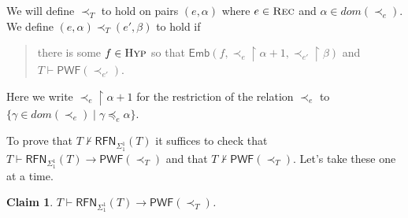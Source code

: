 \documentclass{amsart}
\newtheorem*{claim}{Claim}
\theoremstyle{definition}
\theoremstyle{remark}
\begin{document}

We will define $\prec_T$ to hold on pairs $(e,\alpha)$ where $e\in\textsc{Rec}$ and $\alpha\in dom(\prec_e)$.  We define $(e,\alpha)\prec_T(e',\beta)$ to hold if
\begin{quote}
there is some $f\in\textsc{Hyp}$ so that $\mathsf{Emb}(f,\prec_e\upharpoonright \alpha+1,\prec_{e'}\upharpoonright \beta)$ and $T \vdash \mathsf{PWF}(\prec_{e'})$.
\end{quote}
Here we write $\prec_e\upharpoonright \alpha+1$ for the restriction of the relation $\prec_e$ to $\{\gamma\in dom(\prec_e)\mid \gamma\preceq_e \alpha\}$.

To prove that $T\nvdash \mathsf{RFN}_{\Sigma^1_1}(T)$ it suffices to check that $T\vdash \mathsf{RFN}_{\Sigma^1_1}(T)\to \mathsf{PWF}(\prec_T)$ and that $T\nvdash \mathsf{PWF}(\prec_T)$. Let's take these one at a time.

\begin{claim}
    $T\vdash \mathsf{RFN}_{\Sigma^1_1}(T)\to \mathsf{PWF}(\prec_T)$.
\end{claim}
\end{document}
